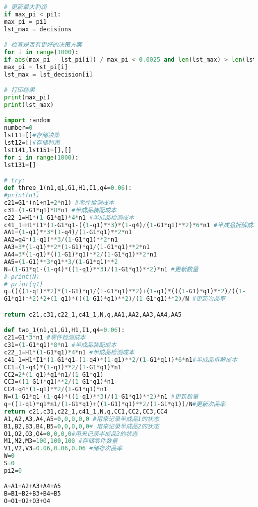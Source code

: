 \documentclass[withoutpreface,bwprint]{cumcmthesis} %
\begin{document}
\begin{lstlisting}[language=python]
# 更新最大利润
if max_pi < pi1:
max_pi = pi1
lst_max = decisions

# 检查是否有更好的决策方案
for i in range(1000):
if abs(max_pi - lst_pi[i]) / max_pi < 0.0025 and len(lst_max) > len(lst_decision[i]):
max_pi = lst_pi[i]
lst_max = lst_decision[i]

# 打印结果
print(max_pi)
print(lst_max)

import random
number=0
lst11=[]#存储决策
lst12=[]#存储利润
lst141,lst151=[],[]
for i in range(1000):
lst131=[]

# try:
def three_1(n1,q1,G1,H1,I1,q4=0.06):
#print(n1)
c21=G1*(n1+n1+2*n1) #零件检测成本
c31=(1-G1*q1)*8*n1 #半成品装配成本
c22_1=H1*(1-G1*q1)*4*n1 #半成品检测成本
c41_1=H1*I1*(1-G1*q1-((1-q1)**3)*(1-q4)/(1-G1*q1)**2)*6*n1 #半成品拆解成本
AA1=(1-q1)**3*(1-q4)/(1-G1*q1)**2*n1
AA2=q4*(1-q1)**3/(1-G1*q1)**2*n1
AA3=3*(1-q1)**2*(1-G1)*q1/(1-G1*q1)**2*n1
AA4=3*(1-q1)*((1-G1)*q1)**2/(1-G1*q1)**2*n1
AA5=(1-G1)**3*q1**3/(1-G1*q1)**2
N=(1-G1*q1-(1-q4)*((1-q1)**3)/(1-G1*q1)**2)*n1 #更新数量
# print(N)
# print(q1)
q=((((1-q1)**2)*(1-G1)*q1/(1-G1*q1)**2)+(1-q1)*(((1-G1)*q1)**2)/((1-
G1*q1)**2)*2+(1-q1)*(((1-G1)*q1)**2)/(1-G1*q1)**2)/N #更新次品率

return c21,c31,c22_1,c41_1,N,q,AA1,AA2,AA3,AA4,AA5

def two_1(n1,q1,G1,H1,I1,q4=0.06):
c21=G1*3*n1 #零件检测成本
c31=(1-G1*q1)*8*n1 #半成品装配成本
c22_1=H1*(1-G1*q1)*4*n1 #半成品检测成本
c41_1=H1*I1*(1-G1*q1-(1-q4)*(1-q1)**2/(1-G1*q1))*6*n1#半成品拆解成本
CC1=(1-q4)*(1-q1)**2/(1-G1*q1)*n1
CC2=2*(1-q1)*q1*n1/(1-G1*q1)
CC3=((1-G1)*q1)**2/(1-G1*q1)*n1
CC4=q4*(1-q1)**2/(1-G1*q1)*n1
N=(1-G1*q1-(1-q4)*((1-q1)**3)/(1-G1*q1)**2)*n1 #更新数量
q=((1-q1)*q1*n1/(1-G1*q1)+((1-G1)*q1)**2/(1-G1*q1))/N#更新次品率
return c21,c31,c22_1,c41_1,N,q,CC1,CC2,CC3,CC4
A1,A2,A3,A4,A5=0,0,0,0,0 #用来记录半成品1的状态
B1,B2,B3,B4,B5=0,0,0,0,0# 用来记录半成品2的状态
O1,O2,O3,O4=0,0,0,0#用来记录半成品3的状态
M1,M2,M3=100,100,100 #存储零件数量
V1,V2,V3=0.06,0.06,0.06 #储存次品率
W=0
S=0
pi2=0

A=A1+A2+A3+A4+A5
B=B1+B2+B3+B4+B5
O=O1+O2+O3+O4



\end{lstlisting}
\end{document}
